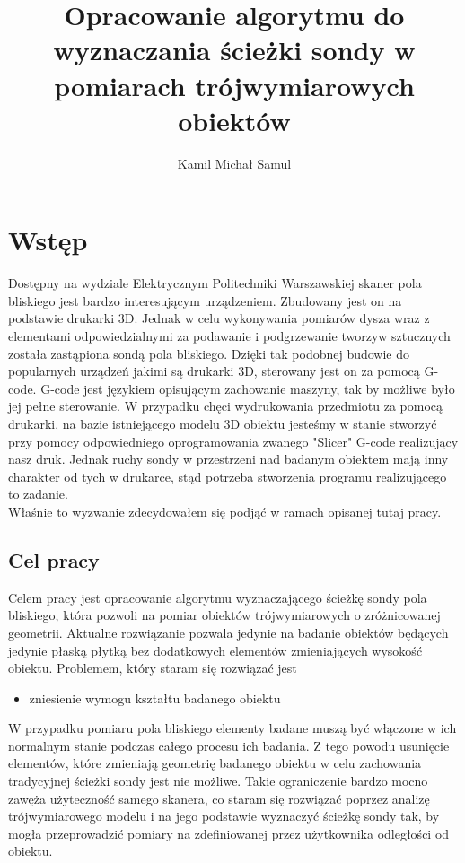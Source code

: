 \documentclass[a4paper,12pt,twoside,openany]{report}
\title{Opracowanie algorytmu do wyznaczania ścieżki sondy w pomiarach trójwymiarowych obiektów}
\author{Kamil Michał Samul}
\begin{document}
\maketitle

\chapter{Wstęp}
  Dostępny na wydziale Elektrycznym Politechniki Warszawskiej skaner pola bliskiego jest bardzo interesującym 
  urządzeniem. Zbudowany jest on na podstawie drukarki 3D. Jednak w celu wykonywania pomiarów dysza wraz z 
  elementami odpowiedzialnymi za podawanie i podgrzewanie tworzyw sztucznych została zastąpiona sondą pola bliskiego. 
  Dzięki tak podobnej budowie do popularnych urządzeń jakimi są drukarki 3D, sterowany jest on za pomocą G-code.
  G-code jest językiem opisującym zachowanie maszyny, tak by możliwe było jej pełne sterowanie.
  W przypadku chęci wydrukowania przedmiotu za pomocą drukarki, na bazie istniejącego modelu 3D obiektu 
  jesteśmy w stanie stworzyć przy pomocy odpowiedniego oprogramowania zwanego "Slicer" G-code realizujący nasz druk.
  Jednak ruchy sondy w przestrzeni nad badanym obiektem mają inny charakter od tych w drukarce, 
  stąd potrzeba stworzenia programu realizującego to zadanie.\\
  Właśnie to wyzwanie zdecydowałem się podjąć w ramach opisanej tutaj pracy.

  \section{Cel pracy}
    Celem pracy jest opracowanie algorytmu wyznaczającego ścieżkę sondy pola bliskiego, 
    która pozwoli na pomiar obiektów trójwymiarowych o zróżnicowanej geometrii.
    Aktualne rozwiązanie pozwala jedynie na badanie obiektów będących jedynie płaską 
    płytką bez dodatkowych elementów zmieniających wysokość obiektu.
    Problemem, który staram się rozwiązać jest 
    \begin{itemize}
      \item zniesienie wymogu kształtu badanego obiektu
    \end{itemize}
    W przypadku pomiaru pola bliskiego elementy badane muszą być włączone w ich normalnym stanie
    podczas całego procesu ich badania. Z tego powodu usunięcie elementów, które zmieniają geometrię
    badanego obiektu w celu zachowania tradycyjnej ścieżki sondy jest nie możliwe.
    Takie ograniczenie bardzo mocno zawęża użyteczność samego skanera, co staram się rozwiązać poprzez analizę
    trójwymiarowego modelu i na jego podstawie wyznaczyć ścieżkę sondy tak, by mogła przeprowadzić pomiary
    na zdefiniowanej przez użytkownika odległości od obiektu.
\end{document}
